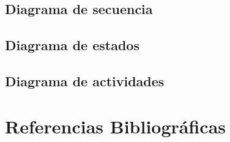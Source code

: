 \documentclass[12pt,twoside]{article}
\begin{document}
	\subsection{Diagrama de secuencia}

	\subsection{Diagrama de estados}

	\subsection{Diagrama de actividades}

	\clearpage
	
	\section{Referencias Bibliográficas}
	
	\begin{thebibliography}{10}
		

	\end{thebibliography}
	
\end{document}
